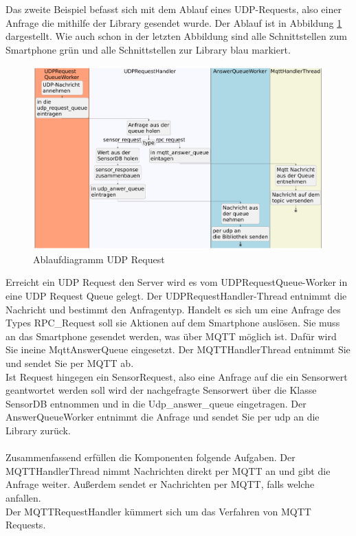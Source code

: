 \documentclass[11pt,a4paper]{report}
\begin{document}
Das zweite Beispiel befasst sich mit dem Ablauf eines UDP-Requests, also einer Anfrage die mithilfe der Library gesendet wurde.
Der Ablauf ist in Abbildung \ref{fig:serverUDPReqPath} dargestellt.
Wie auch schon in der letzten Abbildung sind alle Schnittstellen zum Smartphone grün und alle Schnittstellen zur Library blau markiert.
\begin{figure}[htbp]
  \centering
  \includegraphics[width=\textwidth]{images/UDPRequestServerPath}
  \caption{Ablaufdiagramm UDP Request}
  \label{fig:serverUDPReqPath}
\end{figure}
Erreicht ein UDP Request den Server wird es vom UDPRequestQueue-Worker in eine UDP Request Queue gelegt.
Der UDPRequestHandler-Thread entnimmt die Nachricht und bestimmt den Anfragentyp.
Handelt es sich um eine Anfrage des Types RPC\_Request soll sie Aktionen auf dem Smartphone auslösen.
Sie muss an das Smartphone gesendet werden, was über MQTT möglich ist.
Dafür wird Sie ineine MqttAnswerQueue eingesetzt.
Der MQTTHandlerThread entnimmt Sie und sendet Sie per MQTT ab.
\\
Ist Request hingegen ein SensorRequest, also eine Anfrage auf die ein Sensorwert geantwortet werden soll wird der nachgefragte Sensorwert über die Klasse SensorDB entnommen und in die Udp\_answer\_queue eingetragen.
Der AnswerQueueWorker entnimmt die Anfrage und sendet Sie per udp an die Library zurück.
\\\\
Zusammenfassend erfüllen die Komponenten folgende Aufgaben.
Der MQTTHandlerThread nimmt Nachrichten direkt per MQTT an und gibt die Anfrage weiter.
Außerdem sendet er Nachrichten per MQTT, falls welche anfallen.
\\
Der MQTTRequestHandler kümmert sich um das Verfahren von MQTT Requests.
\end{document}
